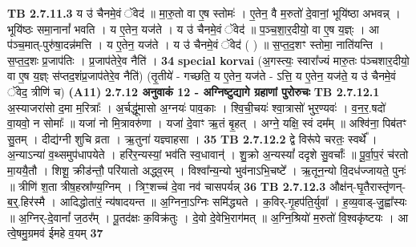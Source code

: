 \documentclass[17pt]{extarticle}
\begin{document}
{                  \newline
                                \textbf{ TB 2.7.11.3} \newline
                  य उ॑ चैनमे॒वं ॅवेद॑ ॥ मा॒रु॒तो वा ए॒ष स्तोमः॑ । ए॒तेन॒ वै म॒रुतो॑ दे॒वानां॒ भूयि॑ष्ठा अभवन्न् । भूयि॑ष्ठः समा॒नानां᳚ भवति । य ए॒तेन॒ यज॑ते । य उ॑ चैनमे॒वं ॅवेद॑ ॥ प॒ञ्च॒शा॒र॒दीयो॒ वा ए॒ष य॒ज्ञ्ः । आ प॑ञ्च॒मात्-पुरु॑षा॒दन्न॑मत्ति । य ए॒तेन॒ यज॑ते । य उ॑ चैनमे॒वं ॅवेद॑ ( ) ॥ स॒प्त॒द॒शꣳ स्तोमा॒ नाति॑यन्ति । स॒प्त॒द॒शः प्र॒जाप॑तिः । प्र॒जाप॑तेरे॒व नैति॑ । \textbf{ 34} \newline
                  \newline
                                                        \textbf{special korvai} \newline
              (अ॒गस्त्यः॒ स्वारा᳚ज्यं मारु॒तः प॑ञ्चशार॒दीयो॒ वा ए॒ष य॒ज्ञ्ः स॑प्तद॒शंप्र॒जाप॑तेरे॒व नैति॑) \newline
                                (तृ॒तीये॑ - गच्छति॒ य ए॒तेन॒ यज॑ते - ऽत्ति॒ य ए॒तेन॒ यज॑ते॒ य उ॑ चैनमे॒वं ॅवेद॒ त्रीणि॑ च) \textbf{(A11)} \newline \newline
                \textbf{ 2.7.12     अनुवाकं   12 - अग्निष्टुद्यागे ग्रहाणां पुरोरुचः} \newline
                                \textbf{ TB 2.7.12.1} \newline
                  अ॒स्याजरा॑सो द॒मा म॒रित्राः᳚ । अ॒र्चद्धू॑मासो अ॒ग्नयः॑ पाव॒काः । श्वि॒ची॒चयः॑ श्वा॒त्रासो॑ भुर॒ण्यवः॑ । व॒न॒र॒.षदो॑ वा॒यवो॒ न सोमाः᳚ ॥ यजा॑ नो मि॒त्रावरु॑णा । यजा॑ दे॒वाꣳ ऋ॒तं बृ॒हत् । अग्ने॒ यक्षि॒ स्वं दम᳚म् ॥ अश्वि॑ना॒ पिब॑तꣳ सु॒तम् । दीद्य॑ग्नी शुचि व्रता । ऋ॒तुना॑ यज्ञ्वाहसा । \textbf{ 35} \newline
                  \newline
                                \textbf{ TB 2.7.12.2} \newline
                  द्वे विरू॑पे चरतः॒ स्वर्थे᳚ । अ॒न्याऽन्या॑ व॒थ्समुप॑धापयेते । हरि॑र॒न्यस्यां॒ भव॑ति स्व॒धावान्॑ । शु॒क्रो अ॒न्यस्यां᳚ ददृशे सु॒वर्चाः᳚ ॥ पू॒र्वा॒प॒रं च॑रतो मा॒ययै॒तौ । शिशू॒ क्रीड॑न्तौ॒ परि॑यातो अद्ध्व॒रम् । विश्वा᳚न्य॒न्यो भुव॑नाऽभि॒चष्टे᳚ । ऋ॒तून॒न्यो वि॒दध॑ज्जायते॒ पुनः॑ ॥ त्रीणि॑ श॒ता त्रीष॒हस्रा᳚ण्य॒ग्निम् । त्रिꣳ॒॒शच्च॑ दे॒वा नव॑ चासपर्यन्न् \textbf{ 36} \newline
                  \newline
                                \textbf{ TB 2.7.12.3} \newline
                  औक्ष॑न्-घृ॒तैरास्तृ॑णन्-ब॒र्॒.हिर॑स्मै । आदिद्धोता॑रं॒ न्य॑षादयन्त ॥ अ॒ग्निना॒ऽग्निः समि॑द्ध्यते । क॒विर्-गृ॒हप॑ति॒र्युवा᳚ । ह॒व्य॒वाड्-जु॒ह्वा᳚स्यः ॥ अ॒ग्निर्-दे॒वानां᳚ ज॒ठर᳚म् । पू॒तद॑क्षः क॒विक्र॑तुः । दे॒वो दे॒वेभि॒राग॑मत् ॥ अ॒ग्नि॒श्रियो॑ म॒रुतो॑ वि॒श्वकृ॑ष्टयः । आ त्वे॒षमु॒ग्रमव॑ ईमहे व॒यम् \textbf{ 37} \newline
}
\end{document}
